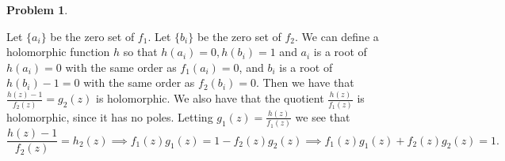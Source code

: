 \documentclass[12pt, a4paper]{article}
\newtheorem{problem}{Problem}
\theoremstyle{definition}
\begin{document}
\newpage
\begin{problem}
\end{problem}
Let $\{a_i\}$ be the zero set of $f_1$. Let $\{b_i\}$ be the zero set of $f_2$. We can define a holomorphic function $h$ so that $h(a_i)=0, h(b_i)=1$ and $a_i$ is a root of $h(a_i)=0$ with the same order as $f_1(a_i)=0$, and $b_i$ is a root of $h(b_i)-1=0$ with the same order as $f_2(b_i)=0$. Then we have that $\frac{h(z) -1}{f_2(z)}=g_2(z)$ is holomorphic. We also have that the quotient $\frac{h(z)}{f_1(z)}$ is holomorphic, since it has no poles. Letting $g_1(z ) = \frac{h(z)}{f_1(z)}$ we see that $$\frac{h(z) - 1}{f_2(z)} = h_2(z) \implies f_1(z)g_1(z) = 1-f_2(z)g_2(z) \implies f_1(z)g_1(z) + f_2(z)g_2(z) = 1. $$
\end{document}
